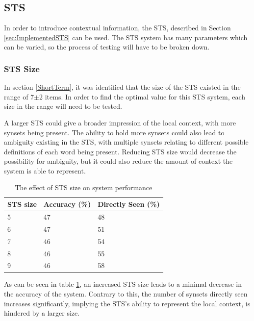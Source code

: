 \documentclass[]{article}
\begin{document}
\subsection{STS}
\label{sec:EvSTS}
In order to introduce contextual information, the STS, described in Section \ref{sec:ImplementedSTS} can be used. The STS system has many parameters which can be varied, so the process of testing will have to be broken down.

\subsubsection{STS Size}
\label{sec:EvSTSSize}
In section \ref{ShortTerm}, it was identified that the size of the STS existed in the range of 7$\pm$2 items. In order to find the optimal value for this STS system, each size in the range will need to be tested.

A larger STS could give a broader impression of the local context, with more synsets being present. The ability to hold more synsets could also lead to ambiguity existing in the STS, with multiple synsets relating to different possible definitions of each word being present. Reducing STS size would decrease the possibility for ambiguity, but it could also reduce the amount of context the system is able to represent.

\begin{table}
\begin{center}
\begin{tabular}{|p{8em}|p{8em}|p{8em}|}
	\hline
	STS size & Accuracy (\%) & Directly Seen (\%) \\
	\hline
	5 & 47 & 48\\
	\hline
	6 & 47 & 51\\
	\hline
	7 & 46 & 54\\
	\hline
	8 & 46 & 55\\
	\hline
	9 & 46 & 58\\
	\hline
\end{tabular}
\end{center}
\caption{The effect of STS size on system performance}
\label{table:STSSize}
\end{table}

As can be seen in table \ref{table:STSSize}, an increased STS size leads to a minimal decrease in the accuracy of the system. Contrary to this, the number of synsets directly seen increases significantly, implying the STS's ability to represent the local context, is hindered by a larger size.
\end{document}

